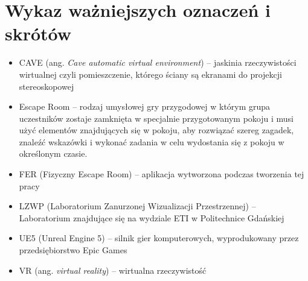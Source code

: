 \chapter*{Wykaz ważniejszych oznaczeń i skrótów}

\begin{itemize}
    \item CAVE (ang. \textit{Cave automatic virtual environment}) -- jaskinia  rzeczywistości wirtualnej czyli pomieszczenie, którego ściany są ekranami do projekcji stereoskopowej

    \item Escape Room -- rodzaj umysłowej gry przygodowej w którym grupa uczestników zostaje zamknięta w specjalnie przygotowanym pokoju i musi użyć elementów znajdujących się w pokoju, aby rozwiązać szereg zagadek, znaleźć wskazówki i wykonać zadania w celu wydostania się z pokoju w określonym czasie.

    \item FER (Fizyczny Escape Room) -- aplikacja wytworzona podczas tworzenia tej pracy 

    \item LZWP (Laboratorium Zanurzonej Wizualizacji Przestrzennej) -- Laboratorium znajdujące się na wydziale ETI w Politechnice Gdańskiej

    \item UE5 (Unreal Engine 5) -- silnik gier komputerowych, wyprodukowany przez przedsiębiorstwo Epic Games

    \item VR (ang. \textit{virtual reality}) -- wirtualna rzeczywistość

\end{itemize}